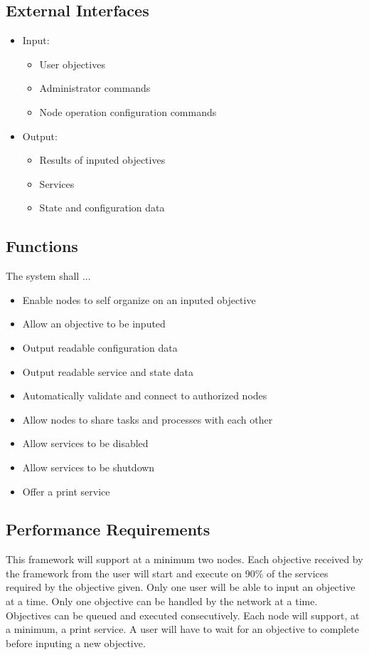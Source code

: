 \documentclass[draftclsnofoot, onecolumn, compsoc, 10pt]{IEEEtran}
\begin{document}
\subsection{External Interfaces}
\begin{itemize}
\item Input:
	\begin{itemize}
	\item User objectives
    \item Administrator commands
    \item Node operation configuration commands
	\end{itemize}
\item Output:
	\begin{itemize}
	\item Results of inputed objectives
    \item Services
    \item State and configuration data 
	\end{itemize}
\end{itemize}

\subsection{Functions}
The system shall ...
\begin{itemize}
\item Enable nodes to self organize on an inputed objective
\item Allow an objective to be inputed
\item Output readable configuration data
\item Output readable service and state data
\item Automatically validate and connect to authorized nodes
\item Allow nodes to share tasks and processes with each other
\item Allow services to be disabled 
\item Allow services to be shutdown
\item Offer a print service
\end{itemize}

\subsection{Performance Requirements}
This framework will support at a minimum two nodes. Each objective received by the framework from the user will start and execute on 90\% of the services required by the objective given. Only one user will be able to input an objective at a time. Only one objective can be handled by the network at a time. Objectives can be queued and executed consecutively. Each node will support, at a minimum, a print service. A user will have to wait for an objective to complete before inputing a new objective. 
\end{document}
